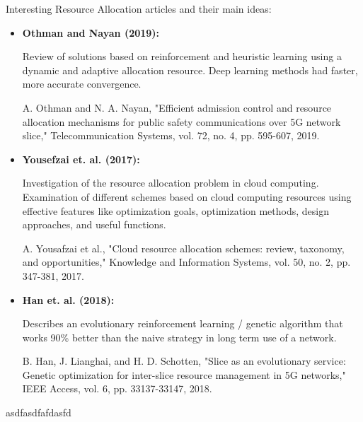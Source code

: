 \documentclass[12pt]{article} %
\begin{document}
    Interesting Resource Allocation articles and their main ideas:
    \begin{itemize}
        \item \textbf{Othman and Nayan (2019): }

            Review of solutions based on reinforcement and heuristic learning using a dynamic and adaptive allocation resource. Deep learning methods had faster, more accurate convergence. 
            
            A. Othman and N. A. Nayan, "Efficient admission control and resource allocation mechanisms for public safety
    communications over 5G network slice," Telecommunication Systems, vol. 72, no. 4, pp. 595-607, 2019.

        \item \textbf{Yousefzai et. al. (2017): }
    
            Investigation of the resource allocation problem in cloud computing. Examination of different schemes based on cloud computing resources using effective features like optimization goals, optimization methods, design approaches, and useful functions. 
            
            A. Yousafzai et al., "Cloud resource allocation schemes: review, taxonomy, and opportunities," Knowledge and Information Systems, vol. 50, no. 2, pp. 347-381, 2017.
            
        \item \textbf{Han et. al. (2018): }
    
            Describes an evolutionary reinforcement learning / genetic algorithm that works 90\% better than the naive strategy in long term use of a network. 
            
            B. Han, J. Lianghai, and H. D. Schotten, "Slice as an evolutionary service: Genetic optimization for inter-slice resource management in 5G networks," IEEE Access, vol. 6, pp. 33137-33147, 2018.
        
    \end{itemize}






asdfasdfafdasfd
\end{document}
